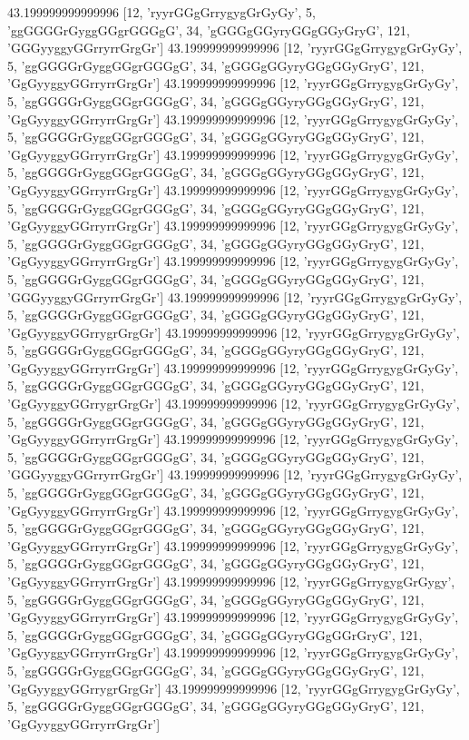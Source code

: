 43.199999999999996 [12, 'ryyrGGgGrrygygGrGyGy', 5, 'ggGGGGrGyggGGgrGGGgG', 34, 'gGGGgGGyryGGgGGyGryG', 121, 'GGGyyggyGGrryrrGrgGr']
43.199999999999996 [12, 'ryyrGGgGrrygygGrGyGy', 5, 'ggGGGGrGyggGGgrGGGgG', 34, 'gGGGgGGyryGGgGGyGryG', 121, 'GgGyyggyGGrryrrGrgGr']
43.199999999999996 [12, 'ryyrGGgGrrygygGrGyGy', 5, 'ggGGGGrGyggGGgrGGGgG', 34, 'gGGGgGGyryGGgGGyGryG', 121, 'GgGyyggyGGrryrrGrgGr']
43.199999999999996 [12, 'ryyrGGgGrrygygGrGyGy', 5, 'ggGGGGrGyggGGgrGGGgG', 34, 'gGGGgGGyryGGgGGyGryG', 121, 'GgGyyggyGGrryrrGrgGr']
43.199999999999996 [12, 'ryyrGGgGrrygygGrGyGy', 5, 'ggGGGGrGyggGGgrGGGgG', 34, 'gGGGgGGyryGGgGGyGryG', 121, 'GgGyyggyGGrryrrGrgGr']
43.199999999999996 [12, 'ryyrGGgGrrygygGrGyGy', 5, 'ggGGGGrGyggGGgrGGGgG', 34, 'gGGGgGGyryGGgGGyGryG', 121, 'GgGyyggyGGrryrrGrgGr']
43.199999999999996 [12, 'ryyrGGgGrrygygGrGyGy', 5, 'ggGGGGrGyggGGgrGGGgG', 34, 'gGGGgGGyryGGgGGyGryG', 121, 'GgGyyggyGGrryrrGrgGr']
43.199999999999996 [12, 'ryyrGGgGrrygygGrGyGy', 5, 'ggGGGGrGyggGGgrGGGgG', 34, 'gGGGgGGyryGGgGGyGryG', 121, 'GGGyyggyGGrryrrGrgGr']
43.199999999999996 [12, 'ryyrGGgGrrygygGrGyGy', 5, 'ggGGGGrGyggGGgrGGGgG', 34, 'gGGGgGGyryGGgGGyGryG', 121, 'GgGyyggyGGrrygrGrgGr']
43.199999999999996 [12, 'ryyrGGgGrrygygGrGyGy', 5, 'ggGGGGrGyggGGgrGGGgG', 34, 'gGGGgGGyryGGgGGyGryG', 121, 'GgGyyggyGGrryrrGrgGr']
43.199999999999996 [12, 'ryyrGGgGrrygygGrGyGy', 5, 'ggGGGGrGyggGGgrGGGgG', 34, 'gGGGgGGyryGGgGGyGryG', 121, 'GgGyyggyGGrrygrGrgGr']
43.199999999999996 [12, 'ryyrGGgGrrygygGrGyGy', 5, 'ggGGGGrGyggGGgrGGGgG', 34, 'gGGGgGGyryGGgGGyGryG', 121, 'GgGyyggyGGrryrrGrgGr']
43.199999999999996 [12, 'ryyrGGgGrrygygGrGyGy', 5, 'ggGGGGrGyggGGgrGGGgG', 34, 'gGGGgGGyryGGgGGyGryG', 121, 'GGGyyggyGGrryrrGrgGr']
43.199999999999996 [12, 'ryyrGGgGrrygygGrGyGy', 5, 'ggGGGGrGyggGGgrGGGgG', 34, 'gGGGgGGyryGGgGGyGryG', 121, 'GgGyyggyGGrryrrGrgGr']
43.199999999999996 [12, 'ryyrGGgGrrygygGrGyGy', 5, 'ggGGGGrGyggGGgrGGGgG', 34, 'gGGGgGGyryGGgGGyGryG', 121, 'GgGyyggyGGrryrrGrgGr']
43.199999999999996 [12, 'ryyrGGgGrrygygGrGyGy', 5, 'ggGGGGrGyggGGgrGGGgG', 34, 'gGGGgGGyryGGgGGyGryG', 121, 'GgGyyggyGGrryrrGrgGr']
43.199999999999996 [12, 'ryyrGGgGrrygygGrGygy', 5, 'ggGGGGrGyggGGgrGGGgG', 34, 'gGGGgGGyryGGgGGyGryG', 121, 'GgGyyggyGGrryrrGrgGr']
43.199999999999996 [12, 'ryyrGGgGrrygygGrGyGy', 5, 'ggGGGGrGyggGGgrGGGgG', 34, 'gGGGgGGyryGGgGGrGryG', 121, 'GgGyyggyGGrryrrGrgGr']
43.199999999999996 [12, 'ryyrGGgGrrygygGrGyGy', 5, 'ggGGGGrGyggGGgrGGGgG', 34, 'gGGGgGGyryGGgGGyGryG', 121, 'GgGyyggyGGrrygrGrgGr']
43.199999999999996 [12, 'ryyrGGgGrrygygGrGyGy', 5, 'ggGGGGrGyggGGgrGGGgG', 34, 'gGGGgGGyryGGgGGyGryG', 121, 'GgGyyggyGGrryrrGrgGr']
